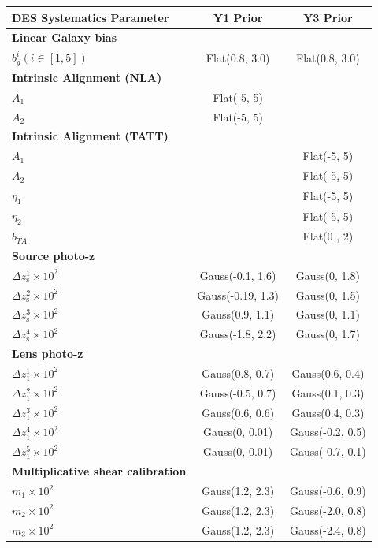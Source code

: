 \begin{table}
\centering
\begin{tabular}{lcc} %
\hline
DES Systematics Parameter &  Y1 Prior & Y3 Prior \\
\hline\hline
\textbf{Linear Galaxy bias} \\
$ b_g^i(i \in [1,5])$ & Flat(0.8, 3.0) & Flat(0.8, 3.0)\\
\hline
\textbf{Intrinsic Alignment (NLA)} \\
$A_{1}$ &  Flat(-5, 5) & \\
$A_{2}$ &  Flat(-5, 5) & \\
\hline
\textbf{Intrinsic Alignment (TATT)} \\
$A_{1}$    & & Flat(-5, 5) \\
$A_{2}$    & & Flat(-5, 5) \\
$\eta_{1}$ & & Flat(-5, 5) \\
$\eta_{2}$ & & Flat(-5, 5) \\
$b_{TA}$   & & Flat(0 , 2) \\
\hline
\textbf{Source photo-z} \\
$\Delta z_{\mathrm{s}}^{1} \times 10^{2}$ & Gauss(-0.1, 1.6)  & Gauss(0, 1.8) \\
$\Delta z_{\mathrm{s}}^{2} \times 10^{2}$ & Gauss(-0.19, 1.3) & Gauss(0, 1.5) \\
$\Delta z_{\mathrm{s}}^{3} \times 10^{2}$ & Gauss(0.9, 1.1)   & Gauss(0, 1.1)\\
$\Delta z_{\mathrm{s}}^{4} \times 10^{2}$ & Gauss(-1.8, 2.2)  & Gauss(0, 1.7)\\
\hline
\textbf{Lens photo-z}\\
$\Delta z_{\mathrm{1}}^{1} \times 10^{2}$ & Gauss(0.8, 0.7)  & Gauss(0.6, 0.4)  \\
$\Delta z_{\mathrm{1}}^{2} \times 10^{2}$ & Gauss(-0.5, 0.7) & Gauss(0.1, 0.3)  \\
$\Delta z_{\mathrm{1}}^{3} \times 10^{2}$ & Gauss(0.6, 0.6)  & Gauss(0.4, 0.3)\\
$\Delta z_{\mathrm{1}}^{4} \times 10^{2}$ & Gauss(0, 0.01)   & Gauss(-0.2, 0.5)\\
$\Delta z_{\mathrm{1}}^{5} \times 10^{2}$ & Gauss(0, 0.01)  & Gauss(-0.7, 0.1)\\
\hline
\textbf{Multiplicative shear calibration} \\
$m_{1} \times 10^2$ & Gauss(1.2, 2.3) & Gauss(-0.6, 0.9)\\
$m_{2} \times 10^2$ & Gauss(1.2, 2.3) & Gauss(-2.0, 0.8)\\
$m_{3} \times 10^2$ & Gauss(1.2, 2.3) & Gauss(-2.4, 0.8)\\

\end{tabular}
\end{table}
